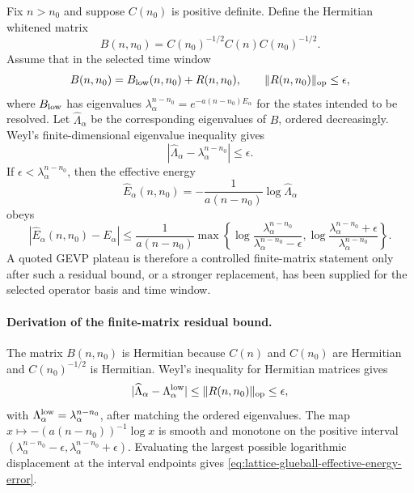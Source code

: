 \begin{controlledapproximation}
\label{ca:lattice-glueball-whitened-residual-criterion}
Fix \(n>n_0\) and suppose \(C(n_0)\) is positive definite.  Define the
Hermitian whitened matrix
\begin{equation}
  B(n,n_0)
  =
  C(n_0)^{-1/2}C(n)C(n_0)^{-1/2}.
  \label{eq:lattice-glueball-whitened-matrix}
\end{equation}
Assume that in the selected time window
\begin{equation}
  B(n,n_0)=B_{\rm low}(n,n_0)+R(n,n_0),
  \qquad
  \|R(n,n_0)\|_{\rm op}\le \epsilon ,
  \label{eq:lattice-glueball-whitened-residual}
\end{equation}
where \(B_{\rm low}\) has eigenvalues
\(\lambda_\alpha^{n-n_0}=e^{-a(n-n_0)E_\alpha}\) for the states intended to
be resolved.  Let \(\widehat\Lambda_\alpha\) be the corresponding eigenvalues
of \(B\), ordered decreasingly.  Weyl's finite-dimensional eigenvalue
inequality gives
\begin{equation}
  |\widehat\Lambda_\alpha-\lambda_\alpha^{n-n_0}|
  \le \epsilon .
  \label{eq:lattice-glueball-weyl-gevp-bound}
\end{equation}
If \(\epsilon<\lambda_\alpha^{n-n_0}\), then the effective energy
\begin{equation}
  \widehat E_\alpha(n,n_0)
  =
  -\frac{1}{a(n-n_0)}\log\widehat\Lambda_\alpha
  \label{eq:lattice-glueball-effective-gevp-energy}
\end{equation}
obeys
\begin{equation}
  |\widehat E_\alpha(n,n_0)-E_\alpha|
  \le
  \frac{1}{a(n-n_0)}
  \max\!\left\{
  \log\frac{\lambda_\alpha^{n-n_0}}
           {\lambda_\alpha^{n-n_0}-\epsilon},
  \log\frac{\lambda_\alpha^{n-n_0}+\epsilon}
           {\lambda_\alpha^{n-n_0}}
  \right\}.
  \label{eq:lattice-glueball-effective-energy-error}
\end{equation}
A quoted GEVP plateau is therefore a controlled finite-matrix statement only
after such a residual bound, or a stronger replacement, has been supplied for
the selected operator basis and time window.
\end{controlledapproximation}

\paragraph{Derivation of the finite-matrix residual bound.}
The matrix \(B(n,n_0)\) is Hermitian because \(C(n)\) and \(C(n_0)\) are
Hermitian and \(C(n_0)^{-1/2}\) is Hermitian.  Weyl's inequality for
Hermitian matrices gives
\[
  |\widehat\Lambda_\alpha-\Lambda_\alpha^{\rm low}|
  \le
  \|R(n,n_0)\|_{\rm op}
  \le\epsilon ,
\]
with \(\Lambda_\alpha^{\rm low}=\lambda_\alpha^{n-n_0}\), after matching the
ordered eigenvalues.  The map \(x\mapsto-(a(n-n_0))^{-1}\log x\) is smooth
and monotone on the positive interval
\((\lambda_\alpha^{n-n_0}-\epsilon,
  \lambda_\alpha^{n-n_0}+\epsilon)\).  Evaluating the largest possible
logarithmic displacement at the interval endpoints gives
\eqref{eq:lattice-glueball-effective-energy-error}.

